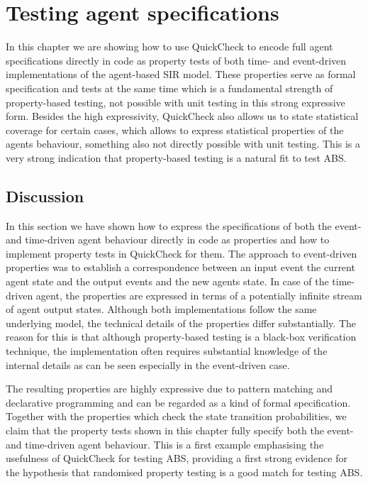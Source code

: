\chapter{Testing agent specifications}
\label{ch:agentspec}

In this chapter we are showing how to use QuickCheck to encode full agent specifications directly in code as property tests of both time- and event-driven implementations of the agent-based SIR model. These properties serve as formal specification and tests at the same time which is a fundamental strength of property-based testing, not possible with unit testing in this strong expressive form. Besides the high expressivity, QuickCheck also allows us to state statistical coverage for certain cases, which allows to express statistical properties of the agents behaviour, something also not directly possible with unit testing. This is a very strong indication that property-based testing is a natural fit to test ABS.





\section{Discussion}
In this section we have shown how to express the specifications of both the event- and time-driven agent behaviour directly in code as properties and how to implement property tests in QuickCheck for them. The approach to event-driven properties was to establish a correspondence between an input event the current agent state and the output events and the new agents state. In case of the time-driven agent, the properties are expressed in terms of a potentially infinite stream of agent output states. Although both implementations follow the same underlying model, the technical details of the properties differ substantially. The reason for this is that although property-based testing is a black-box verification technique, the implementation often requires substantial knowledge of the internal details as can be seen especially in the event-driven case.

The resulting properties are highly expressive due to pattern matching and declarative programming and can be regarded as a kind of formal specification. Together with the properties which check the state transition probabilities, we claim that the property tests shown in this chapter fully specify both the event- and time-driven agent behaviour. This is a first example emphasising the usefulness of QuickCheck for testing ABS, providing a first strong evidence for the hypothesis that randomised property testing is a good match for testing ABS.

